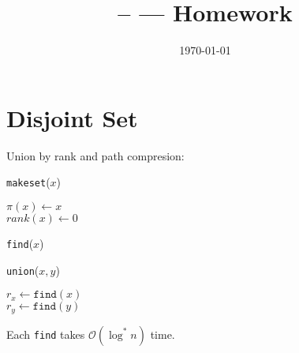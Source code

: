 \documentclass[11pt]{article}
\title{\Class-- \Session --- Homework \Homework}
\author{\Name}
\date{\today}
\begin{document}
	\maketitle
	
	\section*{Disjoint Set}
	Union by rank and path compresion:\\
	\begin{algorithm}[H]
		\caption{\texttt{makeset}($x$)}
		
		$\pi(x) \leftarrow x$\\
		$rank(x) \leftarrow 0$
	\end{algorithm}
	
	\begin{algorithm}[H]
		\caption{\texttt{find}($x$)}
		
	\end{algorithm}

	\begin{algorithm}[H]
		\caption{\texttt{union}($x, y$)}
		
		$r_x \leftarrow \texttt{find}(x)$\\
		$r_y \leftarrow \texttt{find}(y)$\\
	\end{algorithm}
	Each \texttt{find} takes $\mathcal{O}(\log^* n)$ time.
	
\end{document}

